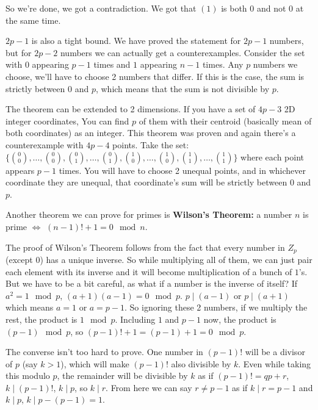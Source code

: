 \documentclass[a4paper,10pt]{article}
\theoremstyle{definition} %
\begin{document}
    So we're done, we got a contradiction. We got that $(1)$ is both $0$ and not $0$ at the 
    same time.

    $2p-1$ is also a tight bound. We have proved the statement for $2p-1$ numbers, but for 
    $2p-2$ numbers we can actually get a counterexamples. Consider the set with $0$ appearing
    $p-1$ times and $1$ appearing $n-1$ times. Any $p$ numbers we choose, we'll have to choose
    2 numbers that differ. If this is the case, the sum is strictly between $0$ and $p$, which 
    means that the sum is not divisible by $p$.

    The theorem can be extended to 2 dimensions. If you have a set of $4p-3$ 2D integer coordinates,
    You can find $p$ of them with their centroid (basically mean of both coordinates) as an
    integer. This theorem was proven and again there's a counterexample with $4p-4$ points. Take 
    the set: \\
    $\{ \binom{0}{0}, \dots, \binom{0}{0}, \binom{0}{1}, \dots, \binom{0}{1}, 
    \binom{1}{0}, \dots, \binom{1}{0}, \binom{1}{1}, \dots , \binom{1}{1}\}$ where each point
    appears $p-1$ times. You will have to choose 2 unequal points, and in whichever coordinate they
    are unequal, that coordinate's sum will be strictly between $0$ and $p$.

    Another theorem we can prove for primes is \textbf{Wilson's Theorem: }a number $n$
    is prime $\iff$ $(n-1)!+1 = 0 \mod n$. 

    The proof of Wilson's Theorem follows from the fact that every number in $Z_p$ (except 0)
    has a unique inverse. So while multiplying all of them, we can just pair each element with 
    its inverse and it will become multiplication of a bunch of $1$'s. But we have to be a bit 
    careful, as what if a number is the inverse of itself? If $a^2 = 1 \mod p$, $(a+1)(a-1)
    = 0 \mod p$. $p \mid (a-1)$ or $p \mid (a+1)$ which means $a = 1$ or $a = p-1$. So ignoring
    these 2 numbers, if we multiply the rest, the product is $1 \mod p$. Including $1$ and $p-1$ now,
    the product is $(p-1) \mod p$, so $(p-1)! + 1 = (p-1) + 1 = 0 \mod p$. 
    
    \newpage
    The converse isn't too hard to prove. 
    One number in $(p-1)!$ will be a divisor of $p$ (say $k > 1$), which will make $(p-1)!$
    also divisible by $k$. Even while taking this modulo $p$, the remainder will be divisible by $k$ as
    if $(p-1)! = qp + r$, $k \mid (p-1)!$, $k \mid p$, so $k \mid r$. From here we can say $r \neq p-1$
    as if $k \mid r = p-1$ and $k \mid p$, $k \mid p - (p-1) = 1$.
\end{document}
